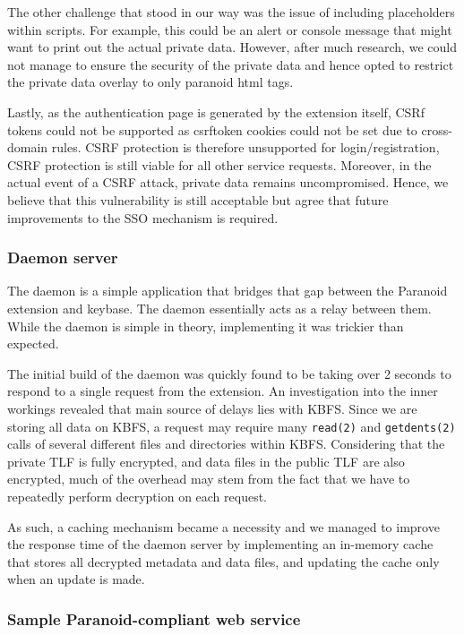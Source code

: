 \documentclass[letterpaper,twocolumn,10pt]{article}
\begin{document}
The other challenge that stood in our way was the issue of including placeholders within scripts. For example, this could be an alert or console message that might want to print out the actual private data. However, after much research, we could not manage to ensure the security of the private data and hence opted to restrict the private data overlay to only paranoid html tags.

Lastly, as the authentication page is generated by the extension itself, CSRf tokens could not be supported as csrftoken cookies could not be set due to cross-domain rules. CSRF protection is therefore unsupported for login/registration, CSRF protection is still viable for all other service requests. Moreover, in the actual event of a CSRF attack, private data remains uncompromised. Hence, we believe that this vulnerability is still acceptable but agree that future improvements to the SSO mechanism is required.

\subsubsection{Daemon server}

The daemon is a simple application that bridges that gap between the Paranoid extension and keybase. The daemon essentially acts as a relay between them. While the daemon is simple in theory, implementing it was trickier than expected.

The initial build of the daemon was quickly found to be taking over 2 seconds to respond to a single request from the extension. An investigation into the inner workings revealed that main source of delays lies with KBFS. Since we are storing all data on KBFS, a request may require many \texttt{read(2)} and \texttt{getdents(2)} calls of several different files and directories within KBFS. Considering that the private TLF is fully encrypted, and data files in the public TLF are also encrypted, much of the overhead may stem from the fact that we have to repeatedly perform decryption on each request.

As such, a caching mechanism became a necessity and we managed to improve the response time of the daemon server by implementing an in-memory cache that stores all decrypted metadata and data files, and updating the cache only when an update is made.

\subsubsection{Sample Paranoid-compliant web service}
\end{document}

